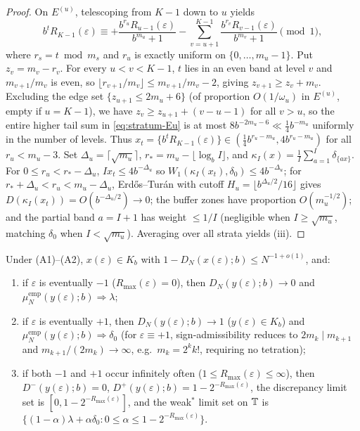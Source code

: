\documentclass[11pt]{article}
\newcommand{\fr}[1]{\{#1\}}
\begin{document}
\begin{proof}
On $E^{(u)}$, telescoping from $K-1$ down to $u$ yields
\begin{equation}\label{eq:stratum-Eu}
b^tR_{K-1}(\varepsilon)\equiv +\frac{b^{r_u}R_{u-1}(\varepsilon)}{b^{m_u}+1}-\sum_{v=u+1}^{K-1}\frac{b^{r_v}R_{v-1}(\varepsilon)}{b^{m_v}+1}\pmod1,
\end{equation}
where $r_s=t\bmod m_s$ and $r_u$ is exactly uniform on $\{0,\dots,m_u-1\}$. Put $z_v=m_v-r_v$. For every $u<v<K-1$, $t$ lies in an even band at level $v$ and $m_{v+1}/m_v$ is even, so $\lfloor r_{v+1}/m_v\rfloor\le m_{v+1}/m_v-2$, giving $z_{v+1}\ge z_v+m_v$. Excluding the edge set $\{z_{u+1}\le 2m_u+6\}$ (of proportion $O(1/\omega_u)$ in $E^{(u)}$, empty if $u=K-1$), we have $z_v\ge z_{u+1}+(v-u-1)$ for all $v>u$, so the entire higher tail sum in \eqref{eq:stratum-Eu} is at most $8b^{-2m_u-6}\ll\frac14b^{-m_u}$ uniformly in the number of levels. Thus $x_t=\fr{b^tR_{K-1}(\varepsilon)}\in(\frac14b^{r_u-m_u},4b^{r_u-m_u})$ for all $r_u<m_u-3$. Set $\Delta_u=\lceil\sqrt{m_u}\rceil$, $r_*=m_u-\lfloor\log_b I\rfloor$, and $\kappa_I(x)=\frac1I\sum_{a=1}^I\delta_{\fr{ax}}$. For $0\le r_u<r_*-\Delta_u$, $Ix_t\le 4b^{-\Delta_u}$ so $W_1(\kappa_I(x_t),\delta_0)\le 4b^{-\Delta_u}$; for $r_*+\Delta_u<r_u<m_u-\Delta_u$, Erd\H{o}s--Tur\'an with cutoff $H_u=\lfloor b^{\Delta_u/2}/16\rfloor$ gives $D(\kappa_I(x_t))=O(b^{-\Delta_u/2})\to0$; the buffer zones have proportion $O(m_u^{-1/2})$; and the partial band $a=I+1$ has weight $\le 1/I$ (negligible when $I\ge\sqrt{m_u}$, matching $\delta_0$ when $I<\sqrt{m_u}$). Averaging over all strata yields (iii).
\end{proof}

\begin{theorem}\label{thm:sign-class}
Under \textup{(A1)}--\textup{(A2)}, $x(\varepsilon)\in K_b$ with $1-D_N(x(\varepsilon);b)\le N^{-1+o(1)}$, and:
\begin{enumerate}[label=\textup{(\roman*)},nosep]
\item if $\varepsilon$ is eventually $-1$ ($R_{\max}(\varepsilon)=0$), then $D_N(y(\varepsilon);b)\to0$ and $\mu_N^{\mathrm{emp}}(y(\varepsilon);b)\Rightarrow\lambda$;
\item if $\varepsilon$ is eventually $+1$, then $D_N(y(\varepsilon);b)\to1$ ($y(\varepsilon)\in K_b$) and $\mu_N^{\mathrm{emp}}(y(\varepsilon);b)\Rightarrow\delta_0$ (for $\varepsilon\equiv+1$, sign-admissibility reduces to $2m_k\mid m_{k+1}$ and $m_{k+1}/(2m_k)\to\infty$, e.g.\ $m_k=2^k k!$, requiring no tetration);
\item if both $-1$ and $+1$ occur infinitely often ($1\le R_{\max}(\varepsilon)\le\infty$), then $D^-(y(\varepsilon);b)=0$, $D^+(y(\varepsilon);b)=1-2^{-R_{\max}(\varepsilon)}$, the discrepancy limit set is $[0,1-2^{-R_{\max}(\varepsilon)}]$, and the weak$^*$ limit set on $\mathbb T$ is $\{(1-\alpha)\lambda+\alpha\delta_0:0\le\alpha\le 1-2^{-R_{\max}(\varepsilon)}\}$.
\end{enumerate}
\end{theorem}
\end{document}
